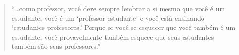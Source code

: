 

\cleartoverso

\begin{quote}
“…como professor, você deve sempre lembrar a si mesmo que você é um
estudante, você é um ‘professor-estudante’ e você está ensinando
‘estudantes-professores.’ Porque se você se esquecer que você também é
um estudante, você provavelmente também esquece que seus estudantes
também são seus professores.”
\end{quote}

